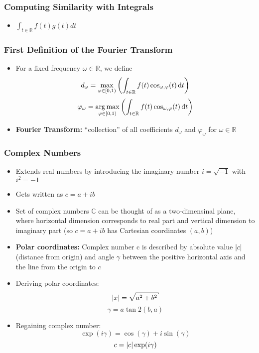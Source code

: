 \subsubsection*{Computing Similarity with Integrals}
\begin{itemize}
    \item
        $\int_{t \in \mathbb{R}} f(t)g(t) dt$
\end{itemize}
\subsubsection*{First Definition of the Fourier Transform}
\begin{itemize}
    \item
        For a fixed frequency $\omega \in \mathbb{R}$, we define
        $$d_\omega = \max_{\varphi \in [0,1)} \left(\int_{t \in \mathbb{R}} f(t) \cos_{\omega, \varphi}(t) \, \mathrm{d} t\right)$$
        $$\varphi_\omega = \operatorname*{arg\,max}_{\varphi \in [0,1)} \left(\int_{t \in \mathbb{R}} f(t) \cos_{\omega, \varphi}(t) \, \mathrm{d} t\right )$$
    \item
			\textbf{Fourier Transform:} \enquote{collection} of all coefficients $d_\omega$ and $\varphi_\omega$ for $\omega \in \mathbb{R}$
\end{itemize}
\subsubsection*{Complex Numbers}
\begin{itemize}
    \item
        Extends real numbers by introducing the imaginary number $i = \sqrt{-1}$ with $i^2 = -1$
    \item
        Gets written as $c = a + ib$ 
    \item
        Set of complex numbers $\mathbb{C}$ can be thought of as a two-dimensinal plane, where horizontal dimension corresponds to real part and vertical dimension to imaginary part (so $c = a+ib$ has Cartesian coordinates $(a,b)$)
    \item
        \textbf{Polar coordinates:} Complex number c is described by absolute value $\lvert c\rvert$ (distance from origin) and angle $\gamma$ between the positive horizontal axis and the line from the origin to $c$
    \item
        Deriving polar coordinates:
        $$ \abs{x} = \sqrt{a^2 + b^2} $$
        $$ \gamma = a\tan2(b, a) $$
    \item
        Regaining complex number:
        $$ \exp(i\gamma) = \cos(\gamma) + i\sin(\gamma) $$
        $$ c = \lvert c\rvert \exp(i\gamma)$$
\end{itemize}
